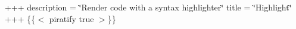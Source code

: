 +++ description = \char`\"{}\+Render code with a syntax highlighter\char`\"{} title = \char`\"{}\+Highlight\char`\"{} +++ \{\{$<$ piratify true $>$\}\} 